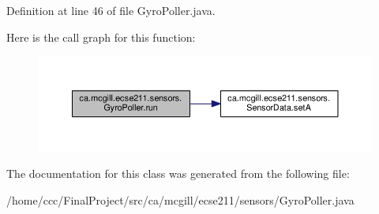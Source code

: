 Definition at line 46 of file Gyro\+Poller.\+java.

Here is the call graph for this function\+:\nopagebreak
\begin{figure}[H]
\begin{center}
\leavevmode
\includegraphics[width=350pt]{classca_1_1mcgill_1_1ecse211_1_1sensors_1_1_gyro_poller_a2a52059192555ece72190fa44a761d28_cgraph}
\end{center}
\end{figure}


The documentation for this class was generated from the following file\+:\begin{DoxyCompactItemize}
\item 
/home/ccc/\+Final\+Project/src/ca/mcgill/ecse211/sensors/Gyro\+Poller.\+java\end{DoxyCompactItemize}
